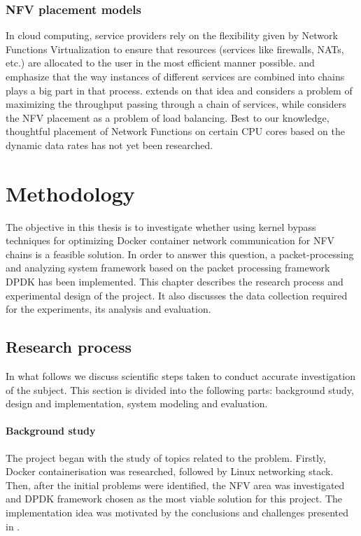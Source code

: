 \documentclass[english]{kththesis}
\begin{document}
\subsection{NFV placement models}
In cloud computing, service providers rely on the flexibility given by Network Functions Virtualization to ensure that resources (services like firewalls, NATs, etc.) are allocated to the user in the most efficient manner possible. \cite{nfv_placement2} and \cite{nfv_placement3} emphasize that the way instances of different services are combined into chains plays a big part in that process. \cite{nfv_placement1} extends on that idea and considers a problem of maximizing the throughput passing through a chain of services, while \cite{nfv_placement4} considers the NFV placement as a problem of load balancing. Best to our knowledge, thoughtful placement of Network Functions on certain CPU cores based on the dynamic data rates has not yet been researched.

\cleardoublepage


\chapter{Methodology}
\label{ch:methods}

The objective in this thesis is to investigate whether using kernel bypass techniques for optimizing Docker container network communication for \gls{NFV} chains is a feasible solution. In order to answer this question, a packet-processing and analyzing system framework based on the packet processing framework \gls{DPDK} has been implemented. This chapter describes the research process and experimental design of the project. It also discusses the data collection required for the experiments, its analysis and evaluation.

\section{Research process}

In what follows we discuss scientific steps taken to conduct accurate investigation of the subject. This section is divided into the following parts: background study, design and implementation, system modeling and evaluation.

\subsubsection{Background study}

The project began with the study of topics related to the problem. Firstly, Docker containerisation was researched, followed by Linux networking stack. Then, after the initial problems were identified, the \gls{NFV} area was investigated and \gls{DPDK} framework chosen as the most viable solution for this project. The implementation idea was motivated by the conclusions and challenges presented in \cite{anderson_2016}.
\end{document}
